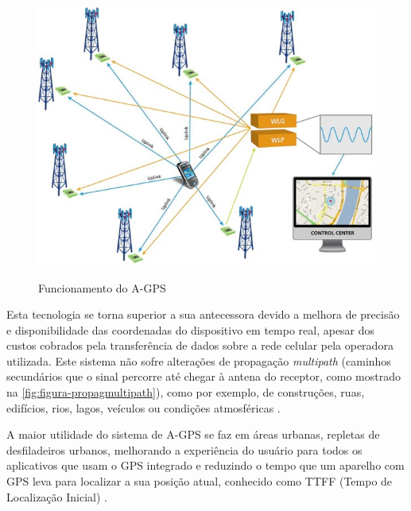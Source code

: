 \begin{figure}[H]
    \centering
    \caption{Funcionamento do A-GPS}
    \includegraphics[width=1.0\textwidth]{./dados/figuras/fig2}
    \label{fig:figura-funcagps}
\end{figure}


Esta tecnologia se torna superior a sua antecessora devido a melhora de precisão e disponibilidade das coordenadas do dispositivo em tempo real, apesar dos custos cobrados pela transferência de dados sobre a rede celular pela operadora utilizada. Este sistema não sofre alterações de propagação \textit{multipath} (caminhos secundários que o sinal percorre até chegar à antena do receptor, como mostrado na \autoref{fig:figura-propagmultipath}), como por exemplo, de construções, ruas, edifícios, rios, lagos, veículos ou condições atmosféricas \cite{oficinanetagps:2018} \cite{multicaminho:2004}.

 A maior utilidade do sistema de A-GPS se faz em áreas urbanas, repletas de desfiladeiros urbanos, melhorando a experiência do usuário para todos os aplicativos que usam o GPS integrado e reduzindo o tempo que um aparelho com GPS leva para localizar a sua posição atual, conhecido como TTFF (Tempo de Localização Inicial) \cite{oficinanetagps:2018}.


